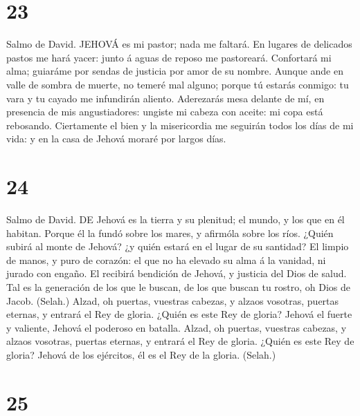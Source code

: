 \hypertarget{section-22}{%
\section{23}\label{section-22}}

 Salmo de David. JEHOVÁ es mi pastor; nada me faltará.
 En lugares de delicados pastos me hará yacer: junto á aguas
de reposo me pastoreará.  Confortará mi alma; guiaráme por
sendas de justicia por amor de su nombre.  Aunque ande en
valle de sombra de muerte, no temeré mal alguno; porque tú estarás
conmigo: tu vara y tu cayado me infundirán aliento. 
Aderezarás mesa delante de mí, en presencia de mis angustiadores:
ungiste mi cabeza con aceite: mi copa está rebosando. 
Ciertamente el bien y la misericordia me seguirán todos los días de mi
vida: y en la casa de Jehová moraré por largos días.

\hypertarget{section-23}{%
\section{24}\label{section-23}}

 Salmo de David. DE Jehová es la tierra y su plenitud; el
mundo, y los que en él habitan.  Porque él la fundó sobre
los mares, y afirmóla sobre los ríos.  ¿Quién subirá al
monte de Jehová? ¿y quién estará en el lugar de su santidad?
 El limpio de manos, y puro de corazón: el que no ha elevado
su alma á la vanidad, ni jurado con engaño.  El recibirá
bendición de Jehová, y justicia del Dios de salud.  Tal es
la generación de los que le buscan, de los que buscan tu rostro, oh Dios
de Jacob. (Selah.)  Alzad, oh puertas, vuestras cabezas, y
alzaos vosotras, puertas eternas, y entrará el Rey de gloria.
 ¿Quién es este Rey de gloria? Jehová el fuerte y valiente,
Jehová el poderoso en batalla.  Alzad, oh puertas, vuestras
cabezas, y alzaos vosotras, puertas eternas, y entrará el Rey de gloria.
 ¿Quién es este Rey de gloria? Jehová de los ejércitos, él
es el Rey de la gloria. (Selah.)

\hypertarget{section-24}{%
\section{25}\label{section-24}}

